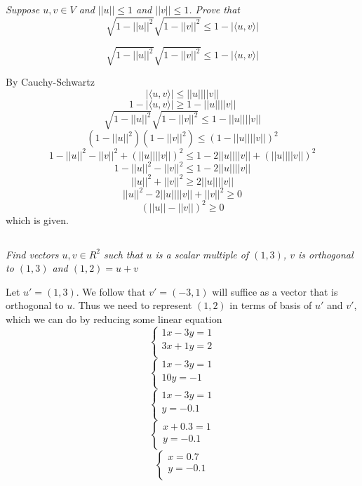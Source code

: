 \documentclass[11pt,oneside,titlepage]{book}
\begin{document}
\subsection{}

\textit{Suppose $u, v \in V$ and $||u|| \leq 1$ and $||v|| \leq 1$. Prove that }
$$\sqrt{1 - ||u||^2}\sqrt{1 - ||v||^2} \leq 1 - |\langle u, v \rangle|$$

$$\sqrt{1 - ||u||^2}\sqrt{1 - ||v||^2} \leq 1 - |\langle u, v \rangle|$$

By Cauchy-Schwartz
$$|\langle u, v \rangle| \leq ||u||||v||$$
$$1 - |\langle u, v \rangle| \geq 1 - ||u||||v||$$
$$\sqrt{1 - ||u||^2}\sqrt{1 - ||v||^2} \leq 1 - ||u||||v||$$
$$(1 - ||u||^2)(1 - ||v||^2) \leq (1 - ||u||||v||)^2$$
$$1 - ||u||^2 - ||v||^2 + (||u||||v||)^2 \leq 1 - 2||u||||v|| + (||u||||v||)^2$$
$$1 - ||u||^2 - ||v||^2 \leq 1 - 2||u||||v||$$
$$||u||^2 + ||v||^2 \geq 2||u||||v||$$
$$||u||^2 - 2||u||||v|| + ||v||^2 \geq 0$$
$$(||u|| - ||v||)^2 \geq 0$$
which is given.

\subsection{}

\textit{Find vectors $u, v \in R^2$ such that $u$ is a scalar multiple of $(1, 3)$,
  $v$ is orthogonal to $(1, 3)$ and $(1, 2) = u + v$}

Let $u' = (1, 3)$. We follow that $v' = (-3, 1)$ will suffice as a vector that is orthogonal to
$u$. Thus we need to represent $(1, 2)$ in terms of basis of $u'$ and $v'$, which we can do
by reducing some linear equation
$$
\begin{cases}
  1 x - 3 y = 1 \\
  3 x + 1 y = 2 \\ 
\end{cases}
$$
$$
\begin{cases}
  1 x - 3 y = 1 \\
  10 y = -1 \\ 
\end{cases}
$$
$$
\begin{cases}
  1 x - 3 y = 1 \\
  y = -0.1 \\ 
\end{cases}
$$
$$
\begin{cases}
  x + 0.3  = 1 \\
  y = -0.1 \\ 
\end{cases}
$$
$$
\begin{cases}
  x = 0.7 \\
  y = -0.1 \\ 
\end{cases}
$$
\end{document}
